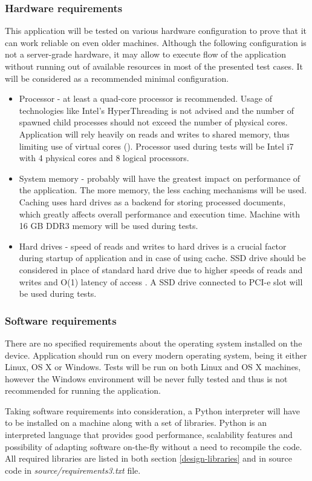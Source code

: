 \subsubsection{Hardware requirements}
This application will be tested on various hardware configuration to prove that it can work reliable on even older machines. Although the following configuration is not a server-grade hardware, it may allow to execute flow of the application without running out of available resources in most of the presented test cases. It will be considered as a recommended minimal configuration.
\begin{itemize}
	\item Processor - at least a quad-core processor is recommended. Usage of technologies like Intel's HyperThreading is not advised and the number of spawned child processes should not exceed the number of physical cores. Application will rely heavily on reads and writes to shared memory, thus limiting use of virtual cores (\cite{performance_ht}). Processor used during tests will be Intel i7 with 4 physical cores and 8 logical processors.
	\item System memory - probably will have the greatest impact on performance of the application. The more memory, the less caching mechanisms will be used. Caching uses hard drives as a backend for storing processed documents, which greatly affects overall performance and execution time. Machine with 16 GB DDR3 memory will be used during tests.
	\item Hard drives - speed of reads and writes to hard drives is a crucial factor during startup of application and in case of using cache. SSD drive should be considered in place of standard hard drive due to higher speeds of reads and writes and O(1) latency of access \cite{performance_hdd_ssd}. A SSD drive connected to PCI-e slot will be used during tests.
\end{itemize}


\subsubsection{Software requirements}
There are no specified requirements about the operating system installed on the device. Application should run on every modern operating system, being it either Linux, OS X or Windows. Tests will be run on both Linux and OS X machines, however the Windows environment will be never fully tested and thus is not recommended for running the application.

Taking software requirements into consideration, a Python interpreter will have to be installed on a machine along with a set of libraries. Python is an interpreted language that provides good performance, scalability features and possibility of adapting software on-the-fly without a need to recompile the code. All required libraries are listed in both section \ref{design-libraries} and in source code in \textit{source/requirements3.txt} file.
 
